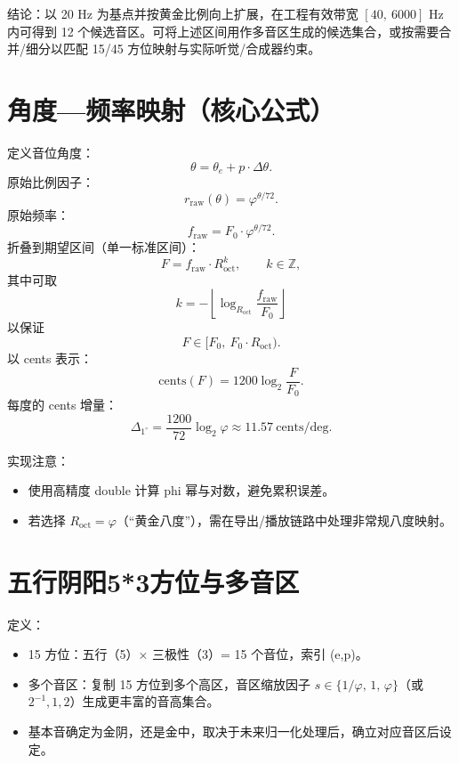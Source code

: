 \documentclass{article}
\begin{document}
结论：以 20 Hz 为基点并按黄金比例向上扩展，在工程有效带宽 $[40,\ 6000]$ Hz 内可得到 12 个候选音区。可将上述区间用作多音区生成的候选集合，或按需要合并/细分以匹配 15/45 方位映射与实际听觉/合成器约束。

\section{角度—频率映射（核心公式）}
定义音位角度：
\[
\theta = \theta_e + p\cdot\Delta\theta .
\]
原始比例因子：
\[
r_{\mathrm{raw}}(\theta)=\varphi^{\theta/72}.
\]
原始频率：
\[
f_{\mathrm{raw}} = F_{0}\cdot \varphi^{\theta/72}.
\]
折叠到期望区间（单一标准区间）：
\[
F = f_{\mathrm{raw}}\cdot R_{\mathrm{oct}}^{k},\qquad k\in\mathbb{Z},
\]
其中可取
\[
k = -\left\lfloor \log_{R_{\mathrm{oct}}}\dfrac{f_{\mathrm{raw}}}{F_{0}} \right\rfloor
\]
以保证
\[
F\in [F_{0},\ F_{0}\cdot R_{\mathrm{oct}}).
\]
以 cents 表示：
\[
\mathrm{cents}(F) = 1200\log_2\frac{F}{F_0}.
\]
每度的 cents 增量：
\[
\Delta_{1^\circ} = \frac{1200}{72}\log_2\varphi \approx 11.57\ \text{cents/deg}.
\]

实现注意：
\begin{itemize}
  \item 使用高精度 double 计算 phi 幂与对数，避免累积误差。
  \item 若选择 $R_{\mathrm{oct}}=\varphi$（“黄金八度”），需在导出/播放链路中处理非常规八度映射。
\end{itemize}

\section{五行阴阳5*3方位与多音区}
定义：
\begin{itemize}
  \item 15 方位：五行（5）× 三极性（3）= 15 个音位，索引 (e,p)。
  \item 多个音区：复制 15 方位到多个高区，音区缩放因子 $s\in\{1/\varphi,\,1,\,\varphi\}$（或 $2^{-1},1,2$）生成更丰富的音高集合。
  \item 基本音确定为金阴，还是金中，取决于未来归一化处理后，确立对应音区后设定。
\end{itemize}
\end{document}

